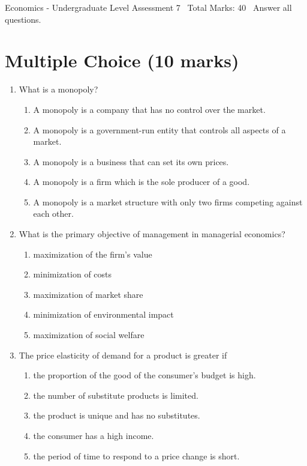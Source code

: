 \documentclass[12pt]{article}
\begin{document}
\begin{center}
Economics - Undergraduate Level Assessment 7 \
Total Marks: 40 \
Answer all questions.
\end{center}

\section*{Multiple Choice (10 marks)}
\begin{enumerate}[label=\arabic*.]
\item What is a monopoly?
\begin{enumerate}[label=(\alph*)]
    \item A monopoly is a company that has no control over the market.
    \item A monopoly is a government-run entity that controls all aspects of a market.
    \item A monopoly is a business that can set its own prices.
    \item A monopoly is a firm which is the sole producer of a good.
    \item A monopoly is a market structure with only two firms competing against each other.
\end{enumerate}
\item What is the primary objective of management in managerial economics?
\begin{enumerate}[label=(\alph*)]
    \item maximization of the firm's value
    \item minimization of costs
    \item maximization of market share
    \item minimization of environmental impact
    \item maximization of social welfare
\end{enumerate}
\item The price elasticity of demand for a product is greater if
\begin{enumerate}[label=(\alph*)]
    \item the proportion of the good of the consumer's budget is high.
    \item the number of substitute products is limited.
    \item the product is unique and has no substitutes.
    \item the consumer has a high income.
    \item the period of time to respond to a price change is short.

\end{enumerate}
\end{enumerate}
\end{document}
